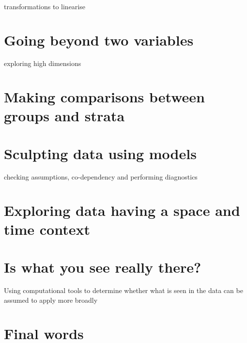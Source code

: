 \documentclass[
]{book}
\begin{document}
transformations to linearise

\hypertarget{going-beyond-two-variables}{%
\chapter{Going beyond two variables}\label{going-beyond-two-variables}}

exploring high dimensions

\hypertarget{making-comparisons-between-groups-and-strata}{%
\chapter{Making comparisons between groups and strata}\label{making-comparisons-between-groups-and-strata}}

\hypertarget{sculpting-data-using-models}{%
\chapter{Sculpting data using models}\label{sculpting-data-using-models}}

checking assumptions, co-dependency and performing diagnostics

\hypertarget{exploring-data-having-a-space-and-time-context}{%
\chapter{Exploring data having a space and time context}\label{exploring-data-having-a-space-and-time-context}}

\hypertarget{is-what-you-see-really-there}{%
\chapter{Is what you see really there?}\label{is-what-you-see-really-there}}

Using computational tools to determine whether what is seen in the data can be assumed to apply more broadly

\hypertarget{final-words}{%
\chapter{Final words}\label{final-words}}

  
\end{document}
